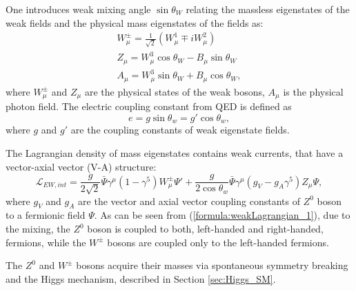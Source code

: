 One introduces weak mixing angle $\sin\theta_W$ relating the massless eigenstates of the weak fields and the physical mass eigenstates of the fields as:%
\begin{equation}
\begin{array}{l}
W^\pm_\mu = \frac{1}{\sqrt{2}}(W^1_\mu \mp iW^2_\mu )\\
Z_\mu = W^3_\mu \cos\theta_W - B_\mu \sin\theta_W\\
A_\mu = W^3_\mu \sin\theta_W + B_\mu \cos\theta_W,
\end{array}
\label{formula:ZWafterSB_1}
\end{equation}
where $W^\pm_\mu$ and $Z_\mu$ are the physical states of the weak bosons, $A_\mu$ is the physical photon field. 
The electric coupling constant from QED is defined as 
\begin{equation}
e = g\sin\theta_w = g'\cos\theta_w,
\end{equation}
where $g$ and $g'$ are the coupling constants of weak eigenstate fields.

The Lagrangian density of mass eigenstates contains weak currents, that have a vector-axial vector (V-A) structure:
\begin{equation}
\mathcal{L}_{EW,int} = \frac{g}{2\sqrt{2}}\bar{\Psi}\gamma^\mu(1-\gamma^5)W^\pm_\mu\Psi' +\frac{g}{2\cos\theta_w} \bar{\Psi}\gamma^\mu(g_V-g_A\gamma^5)Z_\mu\Psi,
    \label{formula:weakLagrangian_1}
\end{equation}
where $g_V$ and $g_A$ are the vector and axial vector coupling constants of $Z^0$ boson to a fermionic field $\Psi$. 
As can be seen from (\ref{formula:weakLagrangian_1}), due to the mixing, the $Z^0$ boson is coupled to both, left-handed and right-handed, fermions, while the $W^\pm$ bosons are coupled only to the left-handed fermions.

The $Z^0$ and $W^\pm$ bosons acquire their masses via spontaneous symmetry breaking and the Higgs mechanism, described in Section \ref{sec:Higgs_SM}.


